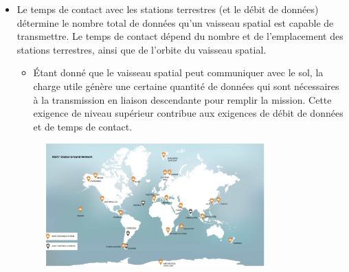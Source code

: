 \begin{itemize}
\item Le temps de contact avec les stations terrestres (et le débit de données) détermine le nombre total de données qu'un vaisseau spatial est capable de transmettre. Le temps de contact dépend du nombre et de l'emplacement des stations terrestres, ainsi que de l'orbite du vaisseau spatial.
\begin{itemize}
\item Étant donné que le vaisseau spatial peut communiquer avec le sol, la charge utile génère une certaine quantité de données qui sont nécessaires à la transmission en liaison descendante pour remplir la mission. Cette exigence de niveau supérieur contribue aux exigences de débit de données et de temps de contact.

\end{itemize}
\begin{figure}[H] %
    \centering
    \includegraphics[width=0.8\textwidth]{figures/6-7.jpg}
    

\end{figure}
\end{itemize}
